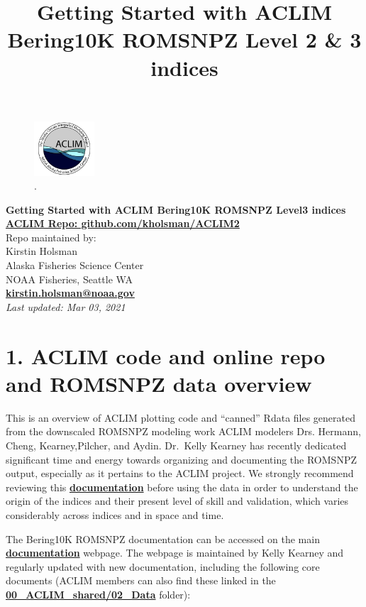 \documentclass[
]{article}
\title{Getting Started with ACLIM Bering10K ROMSNPZ Level 2 \& 3 indices}
\author{}
\date{\vspace{-2.5em}}
\begin{document}
\maketitle

{
\setcounter{tocdepth}{2}
\tableofcontents
}
\begin{figure}
\centering
\includegraphics[width=0.2\textwidth,height=\textheight]{Figs/ACLIM_logo.jpg}
\caption{.}
\end{figure}

\textbf{Getting Started with ACLIM Bering10K ROMSNPZ Level3 indices}\\
\href{https://github.com/kholsman/ACLIM2}{\textbf{ACLIM Repo:
github.com/kholsman/ACLIM2}}\\
Repo maintained by:\\
Kirstin Holsman\\
Alaska Fisheries Science Center\\
NOAA Fisheries, Seattle WA\\
\textbf{\url{kirstin.holsman@noaa.gov}}~\\
\emph{Last updated: Mar 03, 2021}

\hypertarget{aclim-code-and-online-repo-and-romsnpz-data-overview}{%
\section{1. ACLIM code and online repo and ROMSNPZ data
overview}\label{aclim-code-and-online-repo-and-romsnpz-data-overview}}

This is an overview of ACLIM plotting code and ``canned'' Rdata files
generated from the downscaled ROMSNPZ modeling work ACLIM modelers Drs.
Hermann, Cheng, Kearney,Pilcher, and Aydin. Dr.~Kelly Kearney has
recently dedicated significant time and energy towards organizing and
documenting the ROMSNPZ output, especially as it pertains to the ACLIM
project. We strongly recommend reviewing this
\href{https://beringnpz.github.io/roms-bering-sea/B10K-dataset-docs/}{\textbf{documentation}}
before using the data in order to understand the origin of the indices
and their present level of skill and validation, which varies
considerably across indices and in space and time.

The Bering10K ROMSNPZ documentation can be accessed on the main
\href{https://beringnpz.github.io/roms-bering-sea/B10K-dataset-docs/}{\textbf{documentation}}
webpage. The webpage is maintained by Kelly Kearney and regularly
updated with new documentation, including the following core documents
(ACLIM members can also find these linked in the
\href{https://drive.google.com/drive/u/0/folders/0Bx7wdZllbuF9eDJndkhCS2EwQUk}{\textbf{00\_ACLIM\_shared/02\_Data}}
folder):
\end{document}
